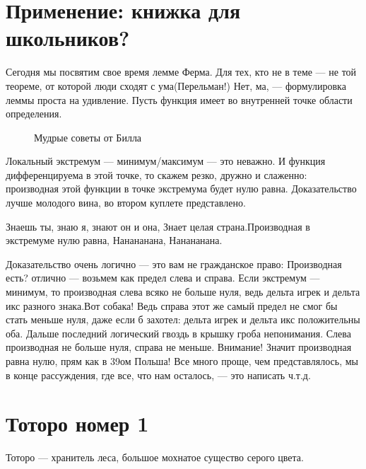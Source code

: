 \documentclass[12pt, a4paper]{article}
\begin{document}
 


\section{Применение: книжка для школьников?} 


Сегодня мы посвятим свое время лемме Ферма. Для тех, кто не в теме --- не той теореме, от которой люди сходят с ума(Перельман!) Нет, ма, --- формулировка леммы проста на удивление. Пусть функция имеет во внутренней точке области определения.

\begin{wrapfigure}{r}{0.3333\linewidth}
 \caption{Мудрые советы от Билла} 
\end{wrapfigure}


Локальный экстремум --- минимум/максимум --- это неважно. И функция дифференцируема в этой точке, то скажем резко, дружно и слаженно: производная этой функции в точке экстремума будет нулю равна. Доказательство лучше молодого вина, во втором куплете представлено.

Знаешь ты, знаю я, знают он и она,
Знает целая страна.Производная в экстремуме нулю равна,
Нанананана, Нанананана.

Доказательство очень логично --- это вам не гражданское право: Производная есть? отлично --- возьмем как предел слева и справа. Если экстремум --- минимум, то производная слева всяко не больше нуля, ведь дельта игрек и дельта икс разного знака.Вот собака! Ведь справа этот же самый предел не смог бы стать меньше нуля, даже если б захотел: дельта игрек и дельта икс положительны оба. Дальше последний логический гвоздь в крышку гроба непонимания. Слева производная не больше нуля, справа не меньше. Внимание! Значит производная равна нулю, прям как в 39ом Польша! Все много проще, чем представлялось, мы в конце рассуждения, где все, что нам осталось, --- это написать ч.т.д.




\newpage

\section{Тоторо номер 1} 


\begin{pleasesay}{Тоторо --- хранитель леса, большое мохнатое существо серого цвета.}
\end{pleasesay}
\end{document}
